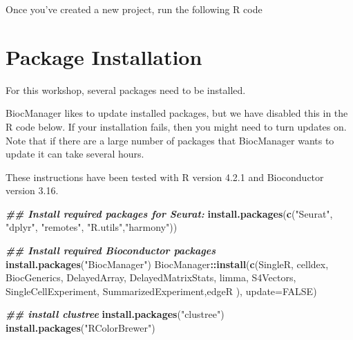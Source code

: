 \documentclass[
]{book}
\newenvironment{Shaded}{\begin{snugshade}}{\end{snugshade}}
\newcommand{\AttributeTok}[1]{\textcolor[rgb]{0.13,0.29,0.53}{#1}}
\newcommand{\ConstantTok}[1]{\textcolor[rgb]{0.56,0.35,0.01}{#1}}
\newcommand{\DocumentationTok}[1]{\textcolor[rgb]{0.56,0.35,0.01}{\textbf{\textit{#1}}}}
\newcommand{\FunctionTok}[1]{\textcolor[rgb]{0.13,0.29,0.53}{\textbf{#1}}}
\newcommand{\NormalTok}[1]{#1}
\newcommand{\SpecialCharTok}[1]{\textcolor[rgb]{0.81,0.36,0.00}{\textbf{#1}}}
\newcommand{\StringTok}[1]{\textcolor[rgb]{0.31,0.60,0.02}{#1}}
\begin{document}
Once you've created a new project, run the following R code

\hypertarget{package-installation}{%
\section{Package Installation}\label{package-installation}}

For this workshop, several packages need to be installed.

BiocManager likes to update installed packages, but we have disabled this in the R code below. If your installation fails, then you might need to turn updates on. Note that if there are a large number of packages that BiocManager wants to update it can take several hours.

These instructions have been tested with R version 4.2.1 and Bioconductor version 3.16.

\begin{Shaded}
\begin{Highlighting}[]
\DocumentationTok{\#\# Install required packages for Seurat:}
\FunctionTok{install.packages}\NormalTok{(}\FunctionTok{c}\NormalTok{(}\StringTok{"Seurat"}\NormalTok{, }\StringTok{"dplyr"}\NormalTok{, }\StringTok{"remotes"}\NormalTok{, }\StringTok{"R.utils"}\NormalTok{,}\StringTok{"harmony"}\NormalTok{))}

\DocumentationTok{\#\# Install required Bioconductor packages}
\FunctionTok{install.packages}\NormalTok{(}\StringTok{"BiocManager"}\NormalTok{)}
\NormalTok{BiocManager}\SpecialCharTok{::}\FunctionTok{install}\NormalTok{(}\FunctionTok{c}\NormalTok{(}\StringTok{\textquotesingle{}SingleR\textquotesingle{}}\NormalTok{, }\StringTok{\textquotesingle{}celldex\textquotesingle{}}\NormalTok{,}
                       \StringTok{\textquotesingle{}BiocGenerics\textquotesingle{}}\NormalTok{, }\StringTok{\textquotesingle{}DelayedArray\textquotesingle{}}\NormalTok{, }\StringTok{\textquotesingle{}DelayedMatrixStats\textquotesingle{}}\NormalTok{,}
                       \StringTok{\textquotesingle{}limma\textquotesingle{}}\NormalTok{, }\StringTok{\textquotesingle{}S4Vectors\textquotesingle{}}\NormalTok{, }\StringTok{\textquotesingle{}SingleCellExperiment\textquotesingle{}}\NormalTok{,}
                       \StringTok{\textquotesingle{}SummarizedExperiment\textquotesingle{}}\NormalTok{,}\StringTok{\textquotesingle{}edgeR\textquotesingle{}}\NormalTok{ ),}
                     \AttributeTok{update=}\ConstantTok{FALSE}\NormalTok{)}


\DocumentationTok{\#\# install clustree}
\FunctionTok{install.packages}\NormalTok{(}\StringTok{"clustree"}\NormalTok{)}
\FunctionTok{install.packages}\NormalTok{(}\StringTok{"RColorBrewer"}\NormalTok{)}
\end{Highlighting}
\end{Shaded}
\end{document}
